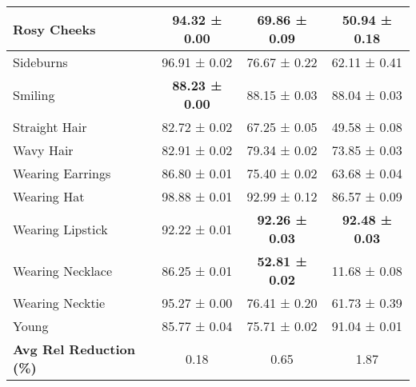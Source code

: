 \begin{table*}[h]
\begin{center}
\begin{small}
{\begin{tabular}{|l|c|c|c|}
Rosy Cheeks        & 94.32 ± 0.00 & 69.86 ± 0.09 & 50.94 ± 0.18 \\ \hline
Sideburns          & 96.91 ± 0.02 & 76.67 ± 0.22 & 62.11 ± 0.41 \\ \hline
Smiling            & \textbf{88.23 ± 0.00} & 88.15 ± 0.03 & 88.04 ± 0.03 \\ \hline
Straight Hair      & 82.72 ± 0.02 & 67.25 ± 0.05 & 49.58 ± 0.08 \\ \hline
Wavy Hair          & 82.91 ± 0.02 & 79.34 ± 0.02 & 73.85 ± 0.03 \\ \hline
Wearing Earrings   & 86.80 ± 0.01 & 75.40 ± 0.02 & 63.68 ± 0.04 \\ \hline
Wearing Hat        & 98.88 ± 0.01 & 92.99 ± 0.12 & 86.57 ± 0.09 \\ \hline
Wearing Lipstick   & 92.22 ± 0.01 & \textbf{92.26 ± 0.03} & \textbf{92.48 ± 0.03} \\ \hline
Wearing Necklace   & 86.25 ± 0.01 & \textbf{52.81 ± 0.02} & 11.68 ± 0.08 \\ \hline
Wearing Necktie    & 95.27 ± 0.00 & 76.41 ± 0.20 & 61.73 ± 0.39 \\ \hline
Young              & 85.77 ± 0.04 & 75.71 ± 0.02 & 91.04 ± 0.01 \\ \hline
\textbf{Avg Rel Reduction (\%)} 
& 0.18 & 0.65 & 1.87 \\ \hline
\end{tabular}
}
\end{small}
\end{center}
\vskip -0.1in
\end{table*}


